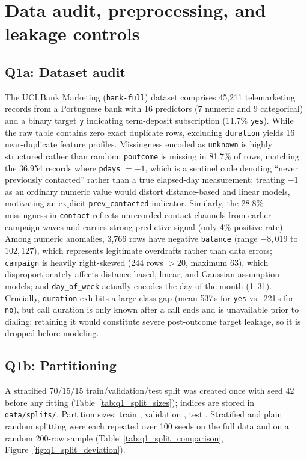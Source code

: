 \section{Data audit, preprocessing, and leakage controls}
\label{sec:audit}

\subsection{Q1a: Dataset audit}

The UCI Bank Marketing (\texttt{bank-full}) dataset comprises 45,211 telemarketing records from a Portuguese bank with 16 predictors (7 numeric and 9 categorical) and a binary target \texttt{y} indicating term-deposit subscription (11.7\% \texttt{yes}). While the raw table contains zero exact duplicate rows, excluding \texttt{duration} yields 16 near-duplicate feature profiles. Missingness encoded as \texttt{unknown} is highly structured rather than random: \texttt{poutcome} is missing in 81.7\% of rows, matching the 36,954 records where \texttt{pdays} $= -1$, which is a sentinel code denoting ``never previously contacted'' rather than a true elapsed-day measurement; treating $-1$ as an ordinary numeric value would distort distance-based and linear models, motivating an explicit \texttt{prev\_contacted} indicator. Similarly, the 28.8\% missingness in \texttt{contact} reflects unrecorded contact channels from earlier campaign waves and carries strong predictive signal (only 4\% positive rate). Among numeric anomalies, 3,766 rows have negative \texttt{balance} (range $-8{,}019$ to $102{,}127$), which represents legitimate overdrafts rather than data errors; \texttt{campaign} is heavily right-skewed (244 rows $> 20$, maximum 63), which disproportionately affects distance-based, linear, and Gaussian-assumption models; and \texttt{day\_of\_week} actually encodes the day of the month (1--31). Crucially, \texttt{duration} exhibits a large class gap (mean 537\,s for \texttt{yes} vs.\ 221\,s for \texttt{no}), but call duration is only known after a call ends and is unavailable prior to dialing; retaining it would constitute severe post-outcome target leakage, so it is dropped before modeling.

\subsection{Q1b: Partitioning}
A stratified 70/15/15 train/validation/test split was created once with seed 42 before any fitting
(Table~\ref{tab:q1_split_sizes}); indices are stored in \texttt{data/splits/}. Partition sizes:
train \NTrain, validation \NVal, test \NTest. Stratified and plain random splitting were each repeated over 100
seeds on the full data and on a random 200-row sample (Table~\ref{tab:q1_split_comparison},
Figure~\ref{fig:q1_split_deviation}).

